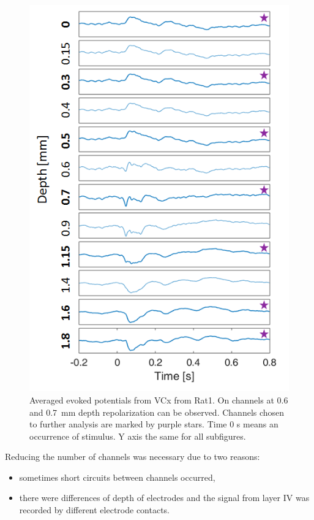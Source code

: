\documentclass{pracalicmgr}
\begin{document}
   \begin{figure}[H]
   	\begin{center}
   		\includegraphics[scale=0.75]{wybieranie_kanalow3.png}
   	\end{center}
   	\caption{ Averaged evoked potentials from VCx from Rat1. On channels at 0.6 and 0.7~mm depth repolarization can be observed. Channels chosen to further analysis are marked by purple stars. Time 0 s means an occurrence of stimulus. Y axis the same for all subfigures.}
   	\label{rys:kanaly}
   \end{figure} 
   
   Reducing the number of channels was necessary due to two reasons:
   \begin{itemize}
   	\item sometimes short circuits between channels occurred,
   	\item there were differences of depth of electrodes and the signal from layer IV was recorded by different electrode contacts.
   \end{itemize} 
   
\end{document}
